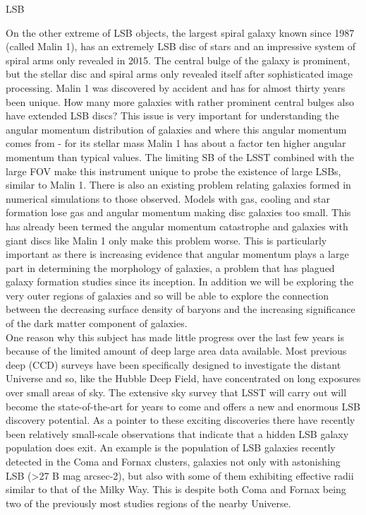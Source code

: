 \begin{tasklist}{LSB}
\begin{task}
{On the other extreme of LSB objects, the largest spiral galaxy known since 1987 (called Malin 1), has an extremely LSB disc of stars and an impressive system of spiral arms only revealed in 2015. The central bulge of the galaxy is prominent, but the stellar disc and spiral arms only revealed itself after sophisticated image processing. Malin 1 was discovered by accident and has for almost thirty years been unique. How many more galaxies with rather prominent central bulges also have extended LSB discs? This issue is very important for understanding the angular momentum distribution of galaxies and where this angular momentum comes from - for its stellar mass Malin 1 has about a factor ten higher angular momentum than typical values. The limiting SB of the LSST combined with the large FOV make this instrument unique to probe the existence of large LSBs, similar to Malin 1. There is also an existing problem relating galaxies formed in numerical simulations to those observed. Models with gas, cooling and star formation lose gas and angular momentum making disc galaxies too small. This has already been termed the angular momentum catastrophe and galaxies with giant discs like Malin 1 only make this problem worse. This is particularly important as there is increasing evidence that angular momentum plays a large part in determining the morphology of galaxies, a problem that has plagued galaxy formation studies since its inception.  In addition we will be exploring the very outer regions of galaxies and so will be able to explore the connection between the decreasing surface density of baryons and the increasing significance of the dark matter component of galaxies.
\\
One reason why this subject has made little progress over the last few years is because of the limited amount of deep large area data available. Most previous deep (CCD) surveys have been specifically designed to investigate the distant Universe and so, like the Hubble Deep Field, have concentrated on long exposures over small areas of sky. The extensive sky survey that LSST will carry out will become the state-of-the-art for years to come and offers a new and enormous LSB discovery potential. As a pointer to these exciting discoveries there have recently been relatively small-scale observations that indicate that a hidden LSB galaxy population does exit. An example is the population of LSB galaxies recently detected in the Coma and Fornax clusters, galaxies not only with astonishing LSB (>27 B mag arcsec-2), but also with some of them exhibiting effective radii similar to that of the Milky Way. This is despite both Coma and Fornax being two of the previously most studies regions of the nearby Universe.
}
\end{task}
\end{tasklist}
